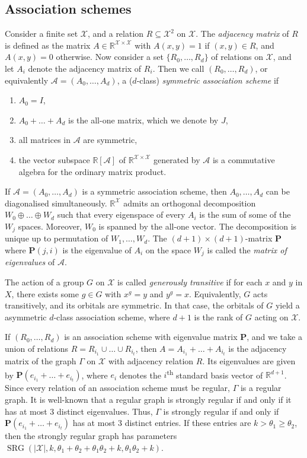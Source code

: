 \documentclass[a4paper]{article}
\theoremstyle{definition}
\newcommand{\RR}{\mathbb R}
\renewcommand{\geq}{\geqslant}
\newcommand{\ma}{\mathcal A}
\newcommand{\mx}{\mathcal X}
\newcommand{\BP}{\boldsymbol P}
\DeclareMathOperator{\SRG}{SRG}
\begin{document}
\subsection{Association schemes}

Consider a finite set $\mx$, and a relation $R \subseteq \mx^2$ on $\mx$.
The \emph{adjacency matrix} of $R$ is defined as the matrix $A \in \RR^{\mx \times \mx}$ with $A(x,y) = 1$ if $(x,y) \in R$, and $A(x,y) = 0$ otherwise.
Now consider a set $\{R_0, \dots, R_d\}$ of relations on $\mx$, and let $A_i$ denote the adjacency matrix of $R_i$.
Then we call $(R_0, \dots, R_d)$, or equivalently $\ma = (A_0, \dots, A_d)$, a ($d$-class) \emph{symmetric association scheme} if
\begin{enumerate}
 \item $A_0 = I$,
 \item $A_0 + \ldots + A_d$ is the all-one matrix, which we denote by $J$,
 \item all matrices in $\ma$ are symmetric,
 \item the vector subspace $\RR[\ma]$ of $\RR^{\mx \times \mx}$ generated by $\ma$ is a commutative algebra for the ordinary matrix product.
\end{enumerate}

If $\ma = (A_0, \dots, A_d)$ is a symmetric association scheme, then $A_0, \dots, A_d$ can be diagonalised simultaneously.
$\RR^\mx$ admits an orthogonal decomposition $W_0 \oplus \dots \oplus W_d$ such that every eigenspace of every $A_i$ is the sum of some of the $W_j$ spaces.
Moreover, $W_0$ is spanned by the all-one vector.
The decomposition is unique up to permutation of $W_1, \dots, W_d$.
The $(d+1) \times (d+1)$-matrix $\BP$ where $\BP(j,i)$ is the eigenvalue of $A_i$ on the space $W_j$ is called the \emph{matrix of eigenvalues} of $\ma$.

The action of a group $G$ on $\mx$ is called \emph{generously transitive} if for each $x$ and $y$ in $X$, there exists some $g \in G$ with $x^g = y$ and $y^g = x$.
Equivalently, $G$ acts transitively, and its orbitals are symmetric.
In that case, the orbitals of $G$ yield a asymmetric $d$-class association scheme, where $d+1$ is the rank of $G$ acting on $\mx$.

\bigskip

If $(R_0, \dots, R_d)$ is an association scheme with eigenvalue matrix $\BP$, and we take a union of relations $R = R_{i_1} \cup \dots \cup R_{i_t}$, then $A = A_{i_1} + \ldots + A_{i_t}$ is the adjacency matrix of the graph $\Gamma$ on $\mx$ with adjacency relation $R$.
Its eigenvalues are given by $\BP (e_{i_1} + \ldots + e_{i_t})$, where $e_i$ denotes the $i$\textsuperscript{th} standard basis vector of $\RR^{d+1}$.
Since every relation of an association scheme must be regular, $\Gamma$ is a regular graph.
It is well-known that a regular graph is strongly regular if and only if it has at most 3 distinct eigenvalues.
Thus, $\Gamma$ is strongly regular if and only if $\BP (e_{i_1} + \ldots + e_{i_t})$ has at most 3 distinct entries.
If these entries are $k > \theta_1 \geq \theta_2$, then the strongly regular graph has parameters $\SRG(|\mx|,k, \theta_1 + \theta_2 + \theta_1 \theta_2 + k,\theta_1 \theta_2 + k)$.
\end{document}
